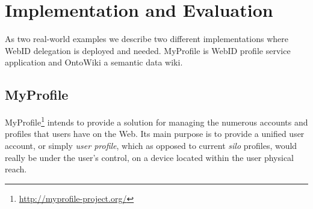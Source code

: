 \documentclass[a4paper]{llncs}
\begin{document}






\section{Implementation and Evaluation}\label{sec:eval}

As two real-world examples we describe two different implementations where WebID delegation is deployed and needed.
MyProfile is WebID profile service application and OntoWiki a semantic data wiki.

\subsection{MyProfile}

MyProfile\footnote{\url{http://myprofile-project.org/}} intends to provide a solution for managing the numerous accounts and profiles that users have on the Web.
Its main purpose is to provide a unified user account, or simply \textit{user profile}, which as opposed to current \textit{silo} profiles, would really be under the user's control, on a device located within the user physical reach.
\end{document}
